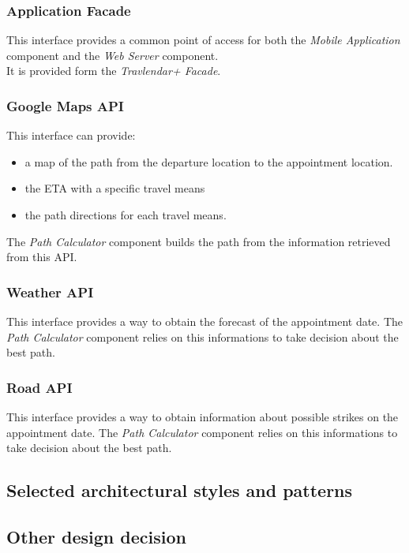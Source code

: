 \subsubsection{Application Facade}
This interface provides a common point of access for both the \emph{Mobile Application} component and the \emph{Web Server} component.\\
It is provided form the \emph{Travlendar+ Facade}.

\subsubsection{Google Maps API}
This interface can provide:
\begin{itemize}
	\item a map of the path from the departure location to the appointment location.
	\item the ETA with a specific travel means
	\item the path directions for each travel means.
\end{itemize}
The \emph{Path Calculator} component builds the path from the information retrieved from this API.

\subsubsection{Weather API}
This interface provides a way to obtain the forecast of the appointment date.
The \emph{Path Calculator} component relies on this informations to take decision about the best path.

\subsubsection{Road API}
This interface provides a way to obtain information about possible strikes on the appointment date.
The \emph{Path Calculator} component relies on this informations to take decision about the best path.

\clearpage
\subsection{Selected architectural styles and patterns}

\clearpage
\subsection{Other design decision}